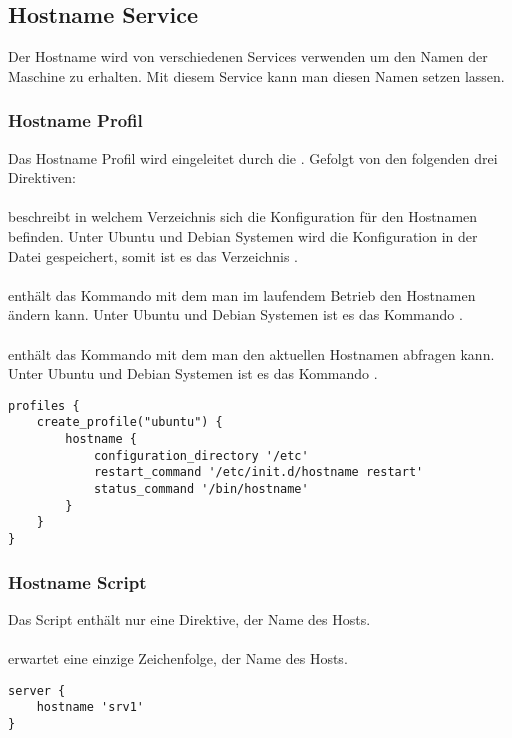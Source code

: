 \subsection{Hostname Service}

Der Hostname wird von verschiedenen Services verwenden um den Namen der Maschine
zu erhalten. Mit diesem Service kann man diesen Namen setzen lassen.

\subsubsection{Hostname Profil}

Das Hostname Profil wird eingeleitet durch die . Gefolgt von
den folgenden drei Direktiven:

\paragraph{}

beschreibt in welchem Verzeichnis
sich die Konfiguration für den Hostnamen befinden. Unter Ubuntu und Debian
Systemen wird die Konfiguration in der Datei  gespeichert,
somit ist es das Verzeichnis .

\paragraph{}

enthält das Kommando mit dem man im
laufendem Betrieb den Hostnamen ändern kann.  Unter Ubuntu und Debian
Systemen ist es das Kommando 
.

\paragraph{}

enthält das Kommando mit dem man den
aktuellen Hostnamen abfragen kann. Unter Ubuntu und Debian Systemen ist es das
Kommando .

\begin{lstlisting}[style=Java, caption=Beispiel Hostname Profil Ubuntu Server]
profiles {
	create_profile("ubuntu") {
		hostname {
			configuration_directory '/etc'
			restart_command '/etc/init.d/hostname restart'
			status_command '/bin/hostname'
		}
	}
}
\end{lstlisting}

\subsubsection{Hostname Script}

Das Script enthält nur eine Direktive, der Name des Hosts.

\paragraph{}

erwartet eine einzige Zeichenfolge, der Name des Hosts.

\begin{lstlisting}[style=Java, caption=Beispiel Hostname Script]
server {
	hostname 'srv1'
}
\end{lstlisting}


